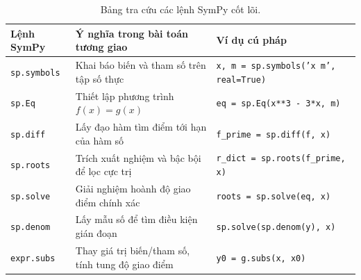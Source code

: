 \begin{table}[H]
\centering
\small
\renewcommand{\arraystretch}{1.25}
\begin{tabular}{|l|p{5.2cm}|p{6.3cm}|}
\hline
\textbf{Lệnh SymPy} & \textbf{Ý nghĩa trong bài toán tương giao} & \textbf{Ví dụ cú pháp} \\ \hline
\texttt{sp.symbols} & Khai báo biến và tham số trên tập số thực & \texttt{x, m = sp.symbols('x m', real=True)} \\ \hline
\texttt{sp.Eq} & Thiết lập phương trình $f(x) = g(x)$ & \texttt{eq = sp.Eq(x**3 - 3*x, m)} \\ \hline
\texttt{sp.diff} & Lấy đạo hàm tìm điểm tới hạn của hàm số & \texttt{f\_prime = sp.diff(f, x)} \\ \hline
\texttt{sp.roots} & Trích xuất nghiệm và bậc bội để lọc cực trị & \texttt{r\_dict = sp.roots(f\_prime, x)} \\ \hline
\texttt{sp.solve} & Giải nghiệm hoành độ giao điểm chính xác & \texttt{roots = sp.solve(eq, x)} \\ \hline
\texttt{sp.denom} & Lấy mẫu số để tìm điều kiện gián đoạn & \texttt{sp.solve(sp.denom(y), x)} \\ \hline
\texttt{expr.subs} & Thay giá trị biến/tham số, tính tung độ giao điểm & \texttt{y0 = g.subs(x, x0)} \\ \hline
\end{tabular}
\caption{Bảng tra cứu các lệnh SymPy cốt lõi.}
\label{tab:cheatsheet}
\end{table}
